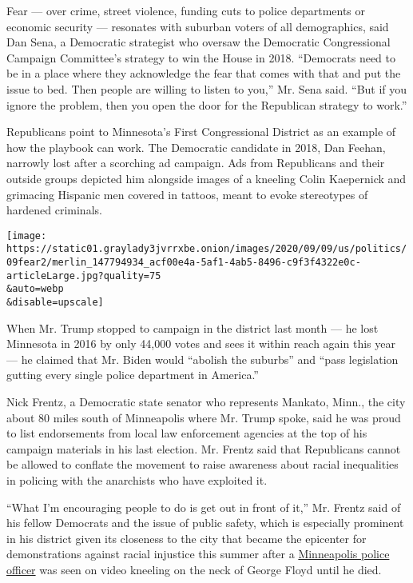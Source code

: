 Fear --- over crime, street violence, funding cuts to police departments
or economic security --- resonates with suburban voters of all
demographics, said Dan Sena, a Democratic strategist who oversaw the
Democratic Congressional Campaign Committee's strategy to win the House
in 2018. ``Democrats need to be in a place where they acknowledge the
fear that comes with that and put the issue to bed. Then people are
willing to listen to you,'' Mr. Sena said. ``But if you ignore the
problem, then you open the door for the Republican strategy to work.''

Republicans point to Minnesota's First Congressional District as an
example of how the playbook can work. The Democratic candidate in 2018,
Dan Feehan, narrowly lost after a scorching ad campaign. Ads from
Republicans and their outside groups depicted him alongside images of a
kneeling Colin Kaepernick and grimacing Hispanic men covered in tattoos,
meant to evoke stereotypes of hardened criminals.

\texttt{[image: https://static01.graylady3jvrrxbe.onion/images/2020/09/09/us/politics/09fear2/merlin\_147794934\_acf00e4a-5af1-4ab5-8496-c9f3f4322e0c-articleLarge.jpg?quality=75\\\&auto=webp\\\&disable=upscale]}

When Mr. Trump stopped to campaign in the district last month --- he
lost Minnesota in 2016 by only 44,000 votes and sees it within reach
again this year --- he claimed that Mr. Biden would ``abolish the
suburbs'' and ``pass legislation gutting every single police department
in America.''

Nick Frentz, a Democratic state senator who represents Mankato, Minn.,
the city about 80 miles south of Minneapolis where Mr. Trump spoke, said
he was proud to list endorsements from local law enforcement agencies at
the top of his campaign materials in his last election. Mr. Frentz said
that Republicans cannot be allowed to conflate the movement to raise
awareness about racial inequalities in policing with the anarchists who
have exploited it.

``What I'm encouraging people to do is get out in front of it,'' Mr.
Frentz said of his fellow Democrats and the issue of public safety,
which is especially prominent in his district given its closeness to the
city that became the epicenter for demonstrations against racial
injustice this summer after a
\href{https://www.nytimes3xbfgragh.onion/2020/07/18/us/derek-chauvin-george-floyd.html}{Minneapolis
police officer} was seen on video kneeling on the neck of George Floyd
until he died.

